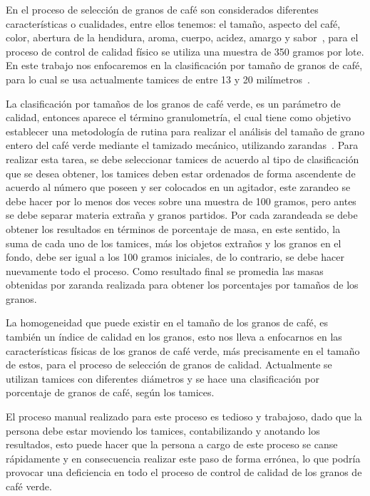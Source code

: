\documentclass[12pt,a4paper,oneside]{book}
\begin{document}
En el proceso de selección de granos de café son considerados diferentes características o cualidades, entre ellos tenemos: el tamaño, aspecto del café, color, abertura de la hendidura, aroma, cuerpo, acidez, amargo y sabor~\cite{Lara2005}, para el proceso de control de calidad físico se utiliza una muestra de 350 gramos por lote. En este trabajo nos enfocaremos en la clasificación por tamaño de granos de café, para lo cual se usa actualmente tamices de entre 13 y 20 milímetros~\cite{Marin2013}. 

La clasificación por tamaños de los granos de café verde, es un parámetro de calidad, entonces aparece el término granulometría, el cual tiene como objetivo establecer una metodología de rutina para realizar el análisis del tamaño de grano entero del café verde mediante el tamizado mecánico, utilizando zarandas~\cite{Funez2010}. Para realizar esta tarea, se debe seleccionar tamices de acuerdo al tipo de clasificación que se desea obtener, los tamices deben estar ordenados de forma ascendente de acuerdo al número que poseen y ser colocados en un agitador, este zarandeo se debe hacer por lo menos dos veces sobre una muestra de 100 gramos, pero antes se debe separar materia extraña y granos partidos. Por cada zarandeada se debe obtener los resultados en términos de porcentaje de masa, en este sentido, la suma de cada uno de los tamices, más los objetos extraños y los granos en el fondo, debe ser igual a los 100 gramos iniciales, de lo contrario, se debe hacer nuevamente todo el proceso. Como resultado final se promedia las masas obtenidas por zaranda realizada para obtener los porcentajes por tamaños de los granos.

La homogeneidad que puede existir en el tamaño de los granos de café, es también un índice de calidad en los granos, esto nos lleva a enfocarnos en las características físicas de los granos de café verde, más precisamente en el tamaño de estos, para el proceso de selección de granos de calidad. Actualmente se utilizan tamices con diferentes diámetros y se hace una clasificación por porcentaje de granos de café, según los tamices.

El proceso manual realizado para este proceso es tedioso y trabajoso, dado que la persona debe estar moviendo los tamices, contabilizando y anotando los resultados, esto puede hacer que la persona a cargo de este proceso se canse rápidamente y en consecuencia realizar este paso de forma errónea, lo que podría provocar una deficiencia en todo el proceso de control de calidad de los granos de café verde.
\end{document}
